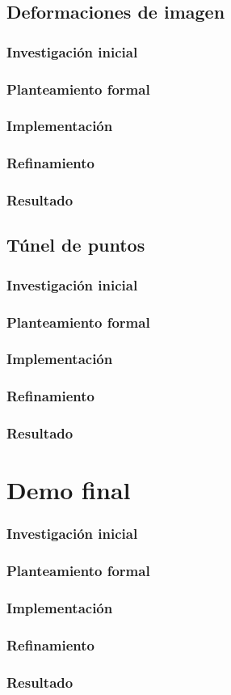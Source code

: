 \section{Deformaciones de imagen}

\subsection{Investigación inicial}
\subsection{Planteamiento formal}
\subsection{Implementación}
\subsection{Refinamiento}
\subsection{Resultado}

\section{Túnel de puntos}

\subsection{Investigación inicial}
\subsection{Planteamiento formal}
\subsection{Implementación}
\subsection{Refinamiento}
\subsection{Resultado}

\chapter{Demo final}

\subsection{Investigación inicial}
\subsection{Planteamiento formal}
\subsection{Implementación}
\subsection{Refinamiento}
\subsection{Resultado}
